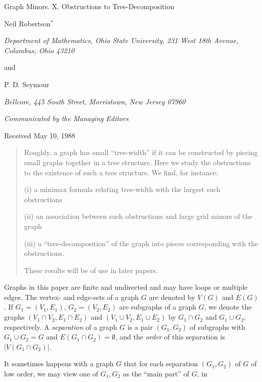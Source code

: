 {\centering
{\Large Graph Minors. X. Obstructions to Tree-Decomposition\par}\medskip

Neil Robertson$^*$\par
\textit{Department of Mathematics, Ohio State University, 231 West 18th Avenue, Columbus, Ohio 43210}\par
and\par
P. D. Seymour\par
\textit{Bellcore, 445 South Street, Morristown, New Jersey 07960}\par
\textit{Communicated by the Managing Editors}\par
Received May 10, 1988\par
}
\begin{quote}
Roughly, a graph has small ``tree-width'' if it can be constructed by piecing small graphs together in a tree structure. Here we study the obstructions to the existence of such a tree structure. We find, for instance:

\hspace*{12pt}(i) a minimax formula relating tree-width with the largest such obstructions

\hspace*{12pt}(ii) an association between such obstructions and large grid minors of the graph

\hspace*{12pt}(iii) a ``tree-decomposition'' of the graph into pieces corresponding with the obstructions.

These results will be of use in later papers.

\end{quote}


Graphs in this paper are finite and undirected and may have loops or multiple edges. The vertex- and edge-sets of a graph $G$ are denoted by $V(G)$ and $E(G)$. If $G_1 = (V_1, E_1)$, $G_2 = (V_2, E_2)$ are subgraphs of a graph $G$, we denote the graphs $(V_1 \cap V_2, E_1 \cap E_2)$ and $(V_1 \cup V_2, E_1 \cup E_2)$ by $G_1 \cap G_2$ and $G_1 \cup G_2$, respectively. A \textit{separation} of a graph $G$ is a pair $(G_1, G_2)$ of subgraphs with $G_1 \cup G_2 = G$ and $E(G_1 \cap G_2) = \emptyset$, and the \textit{order} of this separation is $|V(G_1 \cap G_2)|$.

It sometimes happens with a graph $G$ that for each separation $(G_1, G_2)$ of $G$ of low order, we may view one of $G_1, G_2$ as the ``main part'' of $G$, in%
